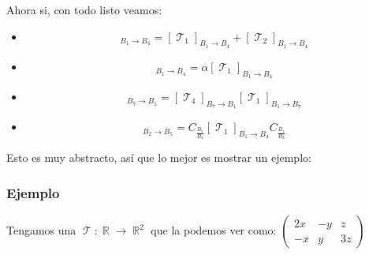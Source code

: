 \documentclass[12pt]{report}                                    %
\DeclareMathOperator \Real {\mathbb{R}}                         %
\DeclareMathOperator \LinealTransformation {\mathcal{T}}        %
\begin{document}
            Ahora si, con todo listo veamos:
            \begin{itemize}
                \item \begin{equation*}
                        [\LinealTransformation_1 + \LinealTransformation_2]_{B_1 \to B_4} = 
                            [\LinealTransformation_1]_{B_1 \to B_4}
                            +
                            [\LinealTransformation_2]_{B_1 \to B_4}
                    \end{equation*}
                
                \item \begin{equation*}
                        [\alpha \LinealTransformation_1]_{B_1 \to B_4} = 
                            \alpha [\LinealTransformation_1]_{B_1 \to B_4}
                    \end{equation*}

                \item \begin{equation*}
                        [\LinealTransformation_4 \circ \LinealTransformation_1]_{B_7 \to B_1} = 
                            [\LinealTransformation_4]_{B_7 \to B_1}
                            [\LinealTransformation_1]_{B_1 \to B_7}
                    \end{equation*}

                \item\begin{equation*}
                        [\LinealTransformation_1]_{B_2 \to B_5} = 
                            C_{\frac{B_5}{B_4}}
                            [\LinealTransformation_1]_{B_1 \to B_4}
                            C_{\frac{B_1}{B_2}}
                    \end{equation*}

            \end{itemize}


        Esto es muy abstracto, así que lo mejor es mostrar un ejemplo:


            \clearpage
            \subsubsection{Ejemplo}

            Tengamos una $\LinealTransformation : \Real \to \Real^2$  que la podemos ver como:
            $\begin{pmatrix} 2x&-y&z\\-x&y&3z\end{pmatrix}$
\end{document}
